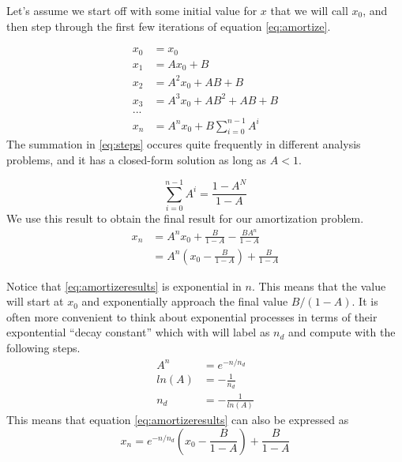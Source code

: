 \documentclass[../../main.tex]{subfiles}
\begin{document}
Let's assume we start off with some initial value for $x$ that we will call
$x_0$, and then step through the first few iterations of equation
\eqref{eq:amortize}.

\begin{align}
    \label{eq:steps}
    x_0 &= x_0\nonumber\\
    x_1 &= A x_0 + B\nonumber\\
    x_2 &= A^2 x_0 + AB + B\nonumber\\
    x_3 &= A^3 x_0 + AB^2 + AB + B\nonumber\\
    ...\nonumber\\
    x_n &=
        A^n x_0 +
        B\sum\limits_{i=0}^{n-1}A^i
\end{align}
The summation in \eqref{eq:steps} occures quite frequently in different
analysis problems, and it has a closed-form solution as long as $A < 1$.

\begin{equation}
    \label{eq:summation}
    \sum\limits_{i=0}^{n-1}A^i = \frac{1 - A ^ N}{1 - A}
\end{equation}
We use this result to obtain the final result for our amortization problem.
\begin{align}
    \label{eq:amortizeresults}
    x_n &= A^n x_0 + \frac{B}{1 - A} - \frac{B A ^ n}{1 - A} \nonumber\\
        &= A^n \left( x_0 - \frac{B}{1 - A} \right) + \frac{B}{1 - A}
\end{align}

Notice that \eqref{eq:amortizeresults} is exponential in $n$.  This means
that the value will start at $x_0$ and exponentially approach the final value
$B / (1-A)$.  It is often more convenient to think about exponential processes
in terms of their expontential ``decay constant'' which with will label as
$n_d$ and compute with the following steps.
\begin{align}
    \label{eq:decay}
    A^n &= e^{-n / n_d} \nonumber\\
    ln(A) &= -\frac{1}{n_d} \nonumber\\
    n_d &= -\frac{1}{ln(A)}
\end{align}
This means that equation \eqref{eq:amortizeresults} can also be expressed as
\begin{equation}
    \label{eq:amortizeresultsexp}
    x_n = e^{-n/n_d}
          \left( x_0 - \frac{B}{1 - A} \right) + \frac{B}{1 - A}
\end{equation}

\end{document}
